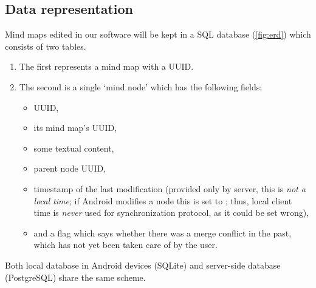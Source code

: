 %
%
%
%
%

\subsection{Data representation}
\label{subsec:data-repr}

Mind maps edited in our software will be kept in a SQL database (\cref{fig:erd}) which consists of two tables.

\begin{enumerate}
	\item The first represents a mind map with a UUID.
	\item The second is a single `mind node' which has the following fields: \begin{itemize}
		\item UUID,
		\item its mind map's UUID,
		\item some textual content,
		\item parent node UUID,
		\item timestamp of the last modification (provided only by server, this is \emph{not a local time}; if Android modifies a node this is set to ; thus, local client time is \emph{never} used for synchronization protocol, as it could be set wrong),
		\item and a flag which says whether there was a merge conflict in the past, which has not yet been taken care of by the user.
	\end{itemize}
\end{enumerate}

Both local database in Android devices (SQLite) and server-side database (PostgreSQL) share the same scheme.


